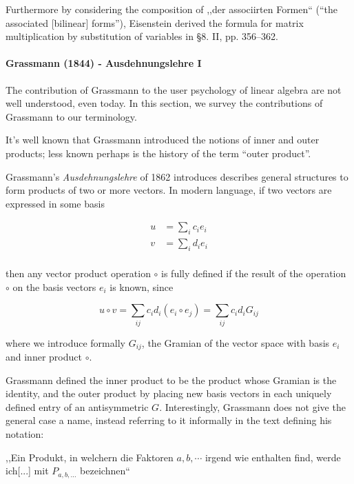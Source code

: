 Furthermore by considering the composition of  ,,der associirten Formen`` (``the associated [bilinear] forms''),
Eisenstein derived the formula for matrix multiplication by substitution of variables
in \S 8. II, pp. 356--362.


\paragraph{Grassmann (1844) - Ausdehnungslehre I~\cite{Grassmann1844,Grassmann1995}}

The contribution of Grassmann to the user psychology of linear algebra are not well understood, even today. In this section, we survey the contributions of Grassmann to our terminology.

It's well known that Grassmann introduced the notions of inner and outer products; less known perhaps is the history of the term ``outer product''.



Grassmann's \textit{Ausdehnungslehre} of 1862\cite[Ch. 2]{Grassmann1862} introduces describes general structures to form products of two or more vectors. In modern language, if two vectors are expressed in some basis

\begin{align}
u & = \sum_i c_i e_i \\
v & = \sum_i d_i e_i \\
\end{align}

then any vector product operation $\circ$ is fully defined if the result of the operation $\circ$ on the basis vectors $e_i$ is known, since

\[
u \circ v = \sum_{ij} c_i d_i (e_i \circ e_j) = \sum_{ij} c_i d_i G_{ij}
\]

where we introduce formally $G_{ij}$, the Gramian of the vector space with basis ${e_i}$ and inner product $\circ$.

Grassmann defined the inner product to be the product whose Gramian is the identity, and the outer product by placing new basis vectors in each uniquely defined entry of an antisymmetric $G$. Interestingly, Grassmann does not give the general case a name, instead referring to it informally in the text defining his notation:

,,Ein Produkt, in welchern die Faktoren $a, b, \cdots$ irgend wie enthalten find, werde ich[...] mit $P_{a,b,...}$ bezeichnen`` \cite[p. 24, \S 43]{Grassmann1862}

